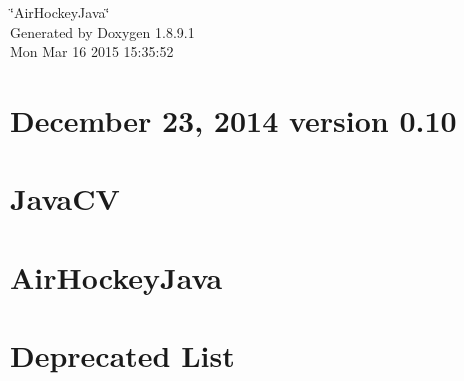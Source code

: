 \documentclass[twoside]{book}
\newcommand{\+}{\discretionary{\mbox{\scriptsize$\hookleftarrow$}}{}{}}
\newcommand{\clearemptydoublepage}{%
  \newpage{\pagestyle{empty}\cleardoublepage}%
}
\begin{document}
\hypersetup{pageanchor=false,
             bookmarks=true,
             bookmarksnumbered=true,
             pdfencoding=unicode
            }
\begin{titlepage}
\vspace*{7cm}
\begin{center}%
{\Large \char`\"{}\+Air\+Hockey\+Java\char`\"{} }\\
\vspace*{1cm}
{\large Generated by Doxygen 1.8.9.1}\\
\vspace*{0.5cm}
{\small Mon Mar 16 2015 15:35:52}\\
\end{center}
\end{titlepage}
\clearemptydoublepage
\tableofcontents
\clearemptydoublepage
{}
\hypersetup{pageanchor=true}

\chapter{December 23, 2014 version 0.10}
\label{md__c_1__users__m_r__documents__git_hub__air_hockey_java_lib_javacv-bin__c_h_a_n_g_e_l_o_g}
\hypertarget{md__c_1__users__m_r__documents__git_hub__air_hockey_java_lib_javacv-bin__c_h_a_n_g_e_l_o_g}{}

\chapter{Java\+C\+V}
\label{md__c_1__users__m_r__documents__git_hub__air_hockey_java_lib_javacv-bin__r_e_a_d_m_e}
\hypertarget{md__c_1__users__m_r__documents__git_hub__air_hockey_java_lib_javacv-bin__r_e_a_d_m_e}{}

\chapter{Air\+Hockey\+Java}
\label{md__c_1__users__m_r__documents__git_hub__air_hockey_java__r_e_a_d_m_e}
\hypertarget{md__c_1__users__m_r__documents__git_hub__air_hockey_java__r_e_a_d_m_e}{}

\chapter{Deprecated List}
\label{deprecated}
\hypertarget{deprecated}{}

\end{document}
